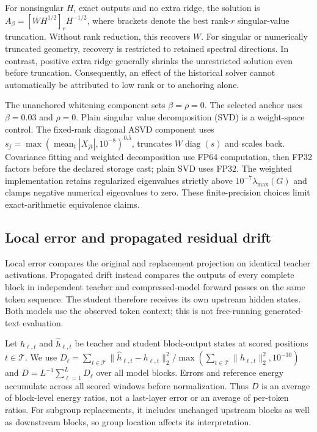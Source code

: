 \documentclass[10pt]{article}
\begin{document}
For nonsingular $H$, exact outputs and no extra ridge, the solution is $A_\beta=[WH^{1/2}]_rH^{-1/2}$, where brackets denote the best rank-$r$ singular-value truncation. Without rank reduction, this recovers $W$. For singular or numerically truncated geometry, recovery is restricted to retained spectral directions. In contrast, positive extra ridge generally shrinks the unrestricted solution even before truncation. Consequently, an effect of the historical solver cannot automatically be attributed to low rank or to anchoring alone.

The unanchored whitening component sets $\beta=\rho=0$. The selected anchor uses $\beta=0.03$ and $\rho=0$. Plain singular value decomposition (SVD) is a weight-space control. The fixed-rank diagonal ASVD component uses $s_j=\max(\operatorname{mean}_t|X_{jt}|,10^{-8})^{0.5}$, truncates $W\operatorname{diag}(s)$ and scales back. Covariance fitting and weighted decomposition use FP64 computation, then FP32 factors before the declared storage cast; plain SVD uses FP32. The weighted implementation retains regularized eigenvalues strictly above $10^{-7}\lambda_{\max}(G)$ and clamps negative numerical eigenvalues to zero. These finite-precision choices limit exact-arithmetic equivalence claims.

\subsection{Local error and propagated residual drift}

Local error compares the original and replacement projection on identical teacher activations. Propagated drift instead compares the outputs of every complete block in independent teacher and compressed-model forward passes on the same token sequence. The student therefore receives its own upstream hidden states. Both models use the observed token context; this is not free-running generated-text evaluation.

Let $h_{\ell,t}$ and $\widehat h_{\ell,t}$ be teacher and student block-output states at scored positions $t\in\mathcal{T}$. We use $D_\ell=\sum_{t\in\mathcal{T}}\|\widehat h_{\ell,t}-h_{\ell,t}\|_2^2/\max(\sum_{t\in\mathcal{T}}\|h_{\ell,t}\|_2^2,10^{-30})$ and $D=L^{-1}\sum_{\ell=1}^{L}D_\ell$ over all model blocks. Errors and reference energy accumulate across all scored windows before normalization. Thus $D$ is an average of block-level energy ratios, not a last-layer error or an average of per-token ratios. For subgroup replacements, it includes unchanged upstream blocks as well as downstream blocks, so group location affects its interpretation.
\end{document}
